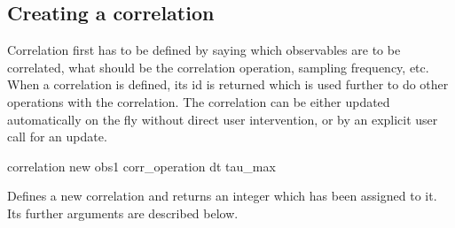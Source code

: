 \subsection{Creating a correlation}

Correlation first has to be defined by saying which observables 
are to be correlated, what should be the correlation operation, sampling
frequency, etc. When a correlation is defined, its id is returned which is
used further to do other operations with the correlation.
The correlation can be either updated automatically on the fly without
direct user intervention, or by an explicit user call for an update.

\begin{essyntax}
correlation new obs1   corr_operation  dt  tau_max   
\end{essyntax}

Defines a new correlation and returns an integer
 which has been assigned to it. 
Its further arguments are described below.

